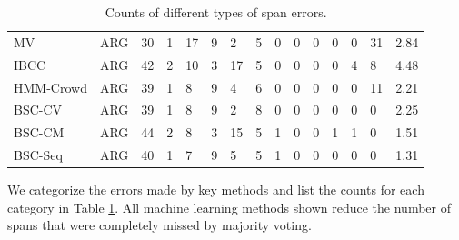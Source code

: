 \begin{table}[h]
\begin{tabularx}{\textwidth}{l X X X X X X X X X X X X X X}
\midrule
MV & ARG & 30 & 1 & 17 & 9 & 2 & 5 & 0 & 0 & 0 & 0 & 0 & 31 & 2.84 \\
IBCC & ARG & 42 & 2 & 10 & 3 & 17 & 5 & 0 & 0 & 0 & 0 & 4 & 8 & 4.48 \\
HMM-Crowd & ARG & 39 & 1 & 8 & 9 & 4 & 6 & 0 & 0 & 0 & 0 & 0 & 11 & 2.21 \\
BSC-CV & ARG & 39 & 1 & 8 & 9 & 2 & 8  & 0 & 0 & 0 & 0 & 0 &  0 & 2.25 \\
BSC-CM & ARG & 44 & 2 & 8 & 3 & 15 & 5 & 1 & 0 & 0 & 1 & 1 & 0 & 1.51 \\
BSC-Seq & ARG & 40 & 1 & 7 & 9 & 5 & 5 & 1 & 0 & 0 & 0 & 0 & 0 & 1.31 \\
\bottomrule
\end{tabularx}
\caption{Counts of different types of span errors.}
\label{tab:error_analysis}
\end{table}
We categorize the errors made by key methods and list the
counts for each category in Table \ref{tab:error_analysis}.
All machine learning methods shown reduce the number of spans that were completely missed by majority
voting. 

